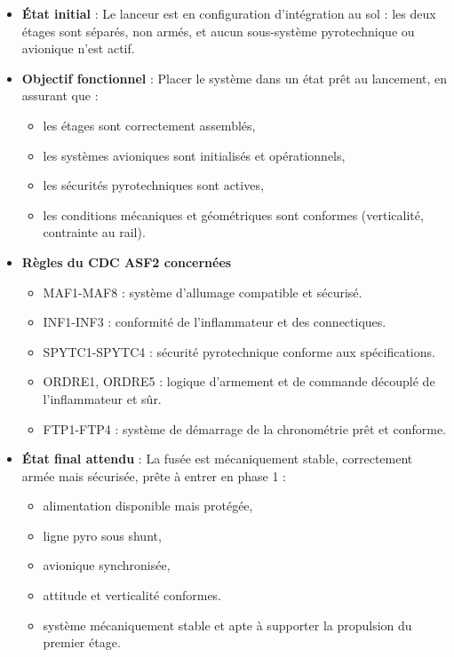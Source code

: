 \begin{itemize}
    \item \textbf{État initial} : Le lanceur est en configuration d’intégration au sol : les deux étages sont séparés, non armés, et
    aucun sous-système pyrotechnique ou avionique n’est actif.
    \item \textbf{Objectif fonctionnel} : Placer le système dans un état prêt au lancement, en assurant que :
    \begin{itemize}
        \item les étages sont correctement assemblés,
        \item les systèmes avioniques sont initialisés et opérationnels,
        \item les sécurités pyrotechniques sont actives,
        \item les conditions mécaniques et géométriques sont conformes (verticalité, contrainte au rail).
    \end{itemize}
    \item \textbf{Règles du \acrshort{CDC} ASF2 concernées}
    \begin{itemize}
        \item MAF1-MAF8\cite[p. ~68-70]{CDC_BiEtage} : système d'allumage compatible et sécurisé.
        \item INF1-INF3\cite[p. ~73-75]{CDC_BiEtage} : conformité de l'inflammateur et des connectiques.
        \item SPYTC1-SPYTC4\cite[p. ~76-77]{CDC_BiEtage} : sécurité pyrotechnique conforme aux spécifications.
        \item ORDRE1, ORDRE5\cite[p. ~78-80]{CDC_BiEtage} : logique d'armement et de commande découplé de l'inflammateur et sûr.
        \item FTP1-FTP4\cite[p. ~84-86]{CDC_BiEtage} : système de démarrage de la chronométrie prêt et conforme.
    \end{itemize}
\newpage
    \item \textbf{État final attendu} : La fusée est mécaniquement stable, correctement armée mais sécurisée, prête à entrer en
    phase 1 :
    \begin{itemize}
        \item alimentation disponible mais protégée,
        \item ligne pyro sous shunt,
        \item avionique synchronisée,
        \item attitude et verticalité conformes.
        \item système mécaniquement stable et apte à supporter la propulsion du premier étage.
    \end{itemize}
\end{itemize}

